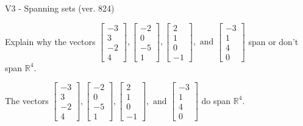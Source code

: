 \begin{exercise}
  \begin{exerciseTitle}V3 - Spanning sets (ver. 824)\end{exerciseTitle}
  \begin{exerciseStatement}
    Explain why the vectors \(\left[\begin{array}{r}
-3 \\
3 \\
-2 \\
4
\end{array}\right] , \left[\begin{array}{r}
-2 \\
0 \\
-5 \\
1
\end{array}\right] , \left[\begin{array}{r}
2 \\
1 \\
0 \\
-1
\end{array}\right] , \text{ and } \left[\begin{array}{r}
-3 \\
1 \\
4 \\
0
\end{array}\right]\) span or don't span \(\mathbb{R}^4\). 
	


  \end{exerciseStatement}
  \begin{exerciseAnswer}
   The vectors \(\left[\begin{array}{r}
-3 \\
3 \\
-2 \\
4
\end{array}\right] , \left[\begin{array}{r}
-2 \\
0 \\
-5 \\
1
\end{array}\right] , \left[\begin{array}{r}
2 \\
1 \\
0 \\
-1
\end{array}\right] , \text{ and } \left[\begin{array}{r}
-3 \\
1 \\
4 \\
0
\end{array}\right]\) 
  	 do  
	span \(\mathbb{R}^4\).
  


  \end{exerciseAnswer}
\end{exercise}